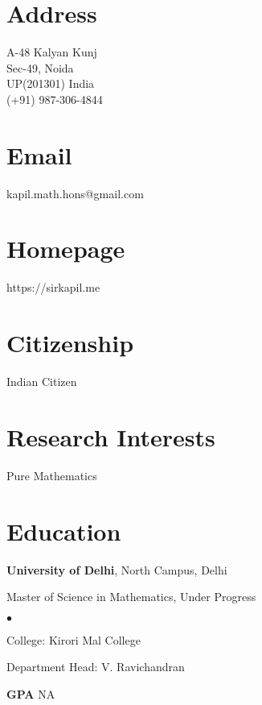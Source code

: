 \documentclass[margin,line]{res}
\newenvironment{list1}{
  \begin{list}{\ding{113}}{%
      \setlength{\itemsep}{0in}
      \setlength{\parsep}{0in} \setlength{\parskip}{0in}
      \setlength{\topsep}{0in} \setlength{\partopsep}{0in} 
      \setlength{\leftmargin}{0.17in}}}{\end{list}}
\newenvironment{list2}{
  \begin{list}{$\bullet$}{%
      \setlength{\itemsep}{0in}
      \setlength{\parsep}{0in} \setlength{\parskip}{0in}
      \setlength{\topsep}{0in} \setlength{\partopsep}{0in} 
      \setlength{\leftmargin}{0.2in}}}{\end{list}}
\begin{document}

\begin{resume}
\section{\sc Address}
\onehalfspacing
A-48 Kalyan Kunj \\ 
Sec-49, Noida \\
UP(201301) India\\
(+91) 987-306-4844

\section{\sc Email}
kapil.math.hons@gmail.com

\section{\sc Homepage}
https://sirkapil.me

\section{\sc Citizenship}
Indian Citizen

\section{\sc Research Interests}
Pure Mathematics
\vspace{0.1in}
\section{\sc Education}
{\bf University of Delhi}, North Campus, Delhi\\
\vspace*{-.1in}
\begin{list1}
\item[] Master of Science in Mathematics, Under Progress
\begin{list2}
\vspace*{.05in}
\item College:  Kirori Mal College
\item Department Head:  V. Ravichandran
\item[] {\bf \footnotesize GPA} NA
\end{list2}
\vspace*{.05in}
\end{list1}


\end{resume}
\end{document}
